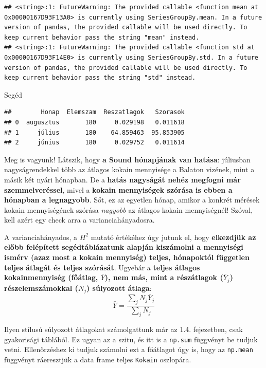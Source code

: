 \documentclass[
]{book}
\newenvironment{Shaded}{\begin{snugshade}}{\end{snugshade}}
\newcommand{\NormalTok}[1]{#1}
\begin{document}
\begin{verbatim}
## <string>:1: FutureWarning: The provided callable <function mean at 0x00000167D93F13A0> is currently using SeriesGroupBy.mean. In a future version of pandas, the provided callable will be used directly. To keep current behavior pass the string "mean" instead.
## <string>:1: FutureWarning: The provided callable <function std at 0x00000167D93F14E0> is currently using SeriesGroupBy.std. In a future version of pandas, the provided callable will be used directly. To keep current behavior pass the string "std" instead.
\end{verbatim}

\begin{Shaded}
\begin{Highlighting}[]
\NormalTok{Segéd}
\end{Highlighting}
\end{Shaded}

\begin{verbatim}
##        Honap  Elemszam  Reszatlagok   Szorasok
## 0  augusztus       180     0.029198   0.011618
## 1     július       180    64.859463  95.853905
## 2     június       180     0.029752   0.011614
\end{verbatim}

Meg is vagyunk! Látszik, hogy \textbf{a Sound hónapjának van hatása}: júliusban nagyságrendekkel több az átlagos kokain mennyisége a Balaton vizének, mint a másik két nyári hónapban. De a \textbf{hatás nagyságát nehéz megfogni már szemmelveréssel}, mivel a \textbf{kokain mennyiségek szórása is ebben a hónapban a legnagyobb}. Sőt, ez az egyetlen hónap, amikor a konkrét mérések kokain mennyiségének szórása \emph{nagyobb} az átlagos kokain mennyiségnél! Szóval, kell azért egy check arra a varianciahányadosra.

A varianciahányados, a \(H^2\) mutató értékéhez úgy jutunk el, hogy \textbf{elkezdjük az előbb felépített segédtáblázatunk alapján kiszámolni a mennyiségi ismérv (azaz most a kokain mennyiség) teljes, hónapoktól független teljes átlagát és teljes szórását}. Ugyebár a \textbf{teljes átlagos kokainmennyiség (főátlag, \(\bar{Y}\)), nem más, mint a részátlagok (\(\bar{Y}_j\)) részelemszámokkal (\(N_j\)) súlyozott átlaga}: \[\bar{Y}=\frac{\sum_j{N_j\bar{Y}_j}}{\sum_j{N_j}}\]

Ilyen stílusú súlyozott átlagokat számolgattunk már az 1.4. fejezetben, csak gyakorisági táblából. Ez ugyan az a szitu, és itt is a \texttt{np.sum} függvényt be tudjuk vetni. Ellenőrzéshez ki tudjuk számolni ezt a főátlagot úgy is, hogy az \texttt{np.mean} függvényt ráeresztjük a data frame teljes \texttt{Kokain} oszlopára.
\end{document}
